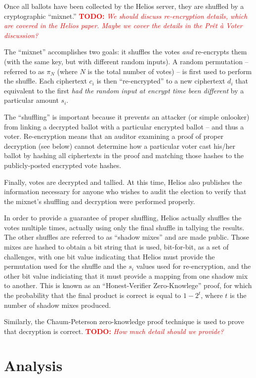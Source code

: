 \documentclass[10pt]{article}
\newcommand{\todo}[1]{\textcolor{red}{\textbf{TODO:} \emph{#1}}}
\begin{document}
\begin{multicols}{2}
Once all ballots have been collected by the Helios server, they are shuffled by a cryptographic
``mixnet.'' \todo{We should discuss re-encryption details, which are covered in the Helios paper.
Maybe we cover the details in the Pr\^{e}t \`{a} Voter discussion?}

The ``mixnet'' accomplishes two goals: it shuffles the votes \emph{and} re-encrypts them (with the
same key, but with different random inputs). A random permutation -- referred to as $\pi_{N}$ (where
$N$ is the total number of votes) -- is first used to perform the shuffle. Each ciphertext 
$c_{i}$ is then ``re-encrypted'' to a new ciphertext $d_{i}$ that equivalent to the first \emph{had
the random input at encrypt time been different} by a particular amount $s_{i}$.

The ``shuffling'' is important because it prevents an attacker (or simple onlooker) from linking
a decrypted ballot with a particular encrypted ballot -- and thus a voter. Re-encryption means that
an auditor examining a proof of proper decryption (see below) cannot determine how a particular
voter cast his/her ballot by hashing all ciphertexts in the proof and matching those hashes to the
publicly-posted encrypted vote hashes.

Finally, votes are decrypted and tallied. At this time, Helios also publishes the information
necessary for anyone who wishes to audit the election to verify that the mixnet's shuffling and
decryption were performed properly.

In order to provide a guarantee of proper shuffling, Helios actually shuffles the votes multiple
times, actually using only the final shuffle in tallying the results. The other shuffles are
referred to as ``shadow mixes'' and are made public. Those mixes are hashed to obtain a bit string
that is used, bit-for-bit, as a set of challenges, with one bit value indicating that Helios must
provide the permutation used for the shuffle and the $s_{i}$ values used for re-encryption, and the 
other bit value indiciating that it must provide a mapping from one shadow mix to another. This is
known as an ``Honest-Verifier Zero-Knowlege'' proof, for which the probability that the final
product is correct is equal to $1 - 2^{t}$, where $t$ is the number of shadow mixes produced.

Similarly, the Chaum-Peterson zero-knowledge proof technique is used to prove that decryption is
correct. \todo{How much detail should we provide?}

\section{Analysis}


\end{multicols}
\end{document}
